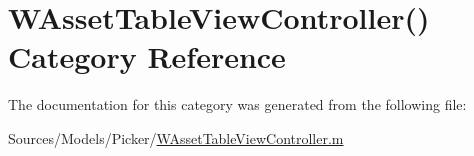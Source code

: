 \hypertarget{category_w_asset_table_view_controller_07_08}{\section{W\-Asset\-Table\-View\-Controller() Category Reference}
\label{category_w_asset_table_view_controller_07_08}
}


The documentation for this category was generated from the following file\-:\begin{DoxyCompactItemize}
\item 
Sources/\-Models/\-Picker/\hyperlink{_w_asset_table_view_controller_8m}{W\-Asset\-Table\-View\-Controller.\-m}\end{DoxyCompactItemize}
